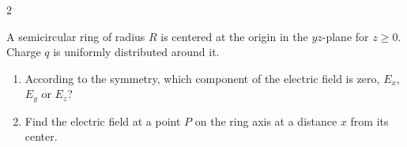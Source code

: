 \begin{paracol}{2}
\begin{problem} %
    A semicircular ring of radius $R$ is centered at the origin in the $yz$-plane for $z\geq 0$. Charge $q$ is uniformly distributed around it.
\begin{enumerate}
    \item According to the symmetry, which component of the electric field is zero, $E_x$, $E_y$ or $E_z$?
    \item Find the electric field at a point $P$ on the ring axis at a distance $x$ from its center.
\end{enumerate}
\end{problem}
\switchcolumn\vspace*{\fill}\centering
\vfill
{}\vspace*{\fill}
\vfill
\end{paracol}
